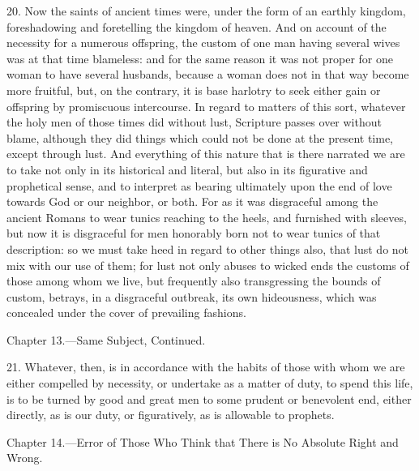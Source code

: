 20. Now the saints of ancient times were, under the form of an earthly kingdom, foreshadowing and foretelling the kingdom of heaven. And on account of the necessity for a numerous offspring, the custom of one man having several wives was at that time blameless: and for the same reason it was not proper for one woman to have several husbands, because a woman does not in that way become more fruitful, but, on the contrary, it is base harlotry to seek either gain or offspring by promiscuous intercourse. In regard to matters of this sort, whatever the holy men of those times did without lust, Scripture passes over without blame, although they did things which could not be done at the present time, except through lust. And everything of this nature that is there narrated we are to take not only in its historical and literal, but also in its figurative and prophetical sense, and to interpret as bearing ultimately upon the end of love towards God or our neighbor, or both. For as it was disgraceful among the ancient Romans to wear tunics reaching to the heels, and furnished with sleeves, but now it is disgraceful for men honorably born not to wear tunics of that description: so we must take heed in regard to other things also, that lust do not mix with our use of them; for lust not only abuses to wicked ends the customs of those among whom we live, but frequently also transgressing the bounds of custom, betrays, in a disgraceful outbreak, its own hideousness, which was concealed under the cover of prevailing fashions.


Chapter 13.—Same Subject, Continued.

21. Whatever, then, is in accordance with the habits of those with whom we are either compelled by necessity, or undertake as a matter of duty, to spend this life, is to be turned by good and great men to some prudent or benevolent end, either directly, as is our duty, or figuratively, as is allowable to prophets.


Chapter 14.—Error of Those Who Think that There is No Absolute Right and Wrong.

